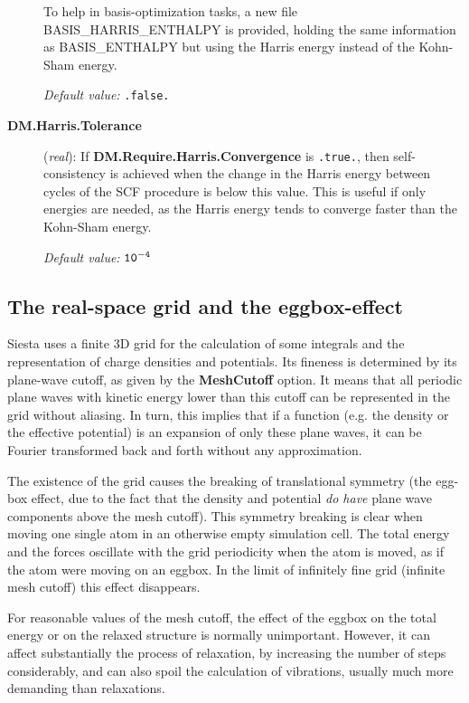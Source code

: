 \documentclass[11pt]{article}
\begin{document}
\begin{description}
To help in basis-optimization tasks, a new file BASIS\_HARRIS\_ENTHALPY
is provided, holding the same information as BASIS\_ENTHALPY but using
the Harris energy instead of the Kohn-Sham energy.

{\it Default value:} {\tt .false.}


\item[{\bf DM.Harris.Tolerance}] ({\it real}):
If {\bf DM.Require.Harris.Convergence} is {\tt .true.}, then
self-consistency is achieved when the change in the Harris energy between cycles
of the SCF procedure is below this value.
This is useful if only energies are needed, as the Harris energy tends
to converge faster than the Kohn-Sham energy.

{\it Default value:} {${\tt 10^{-4}}$}

\end{description}

\vspace{5pt}
\subsection{The real-space grid and the eggbox-effect}

{\sc Siesta} uses a finite 3D grid for the calculation of some
integrals and the representation of charge densities and potentials.
Its fineness is determined by its plane-wave cutoff, as
given by the {\bf MeshCutoff} option. It means that all periodic
plane waves with kinetic energy lower than this cutoff 
can be represented in the grid without aliasing. In turn,
this implies that if a function (e.g. the density or the 
effective potential) is an expansion of
only these plane waves, it can be Fourier transformed
back and forth without any approximation.

The existence of the grid causes the breaking of translational
symmetry (the egg-box effect, due to the fact that the density
and potential {\it do have} plane wave components above
the mesh cutoff).  This symmetry breaking is clear when
moving one single atom in an otherwise empty simulation cell. The
total energy and the forces oscillate with the grid periodicity when
the atom is moved, as if the atom were moving on an eggbox. In the
limit of infinitely fine grid (infinite mesh cutoff) this effect
disappears.

For reasonable values of the mesh cutoff, the effect of the eggbox
on the total energy or on the relaxed structure is normally unimportant.
However, it can affect substantially the process of relaxation, by
increasing the number of steps considerably, and can also spoil the
calculation of vibrations, usually much more demanding than relaxations.
\end{document}
